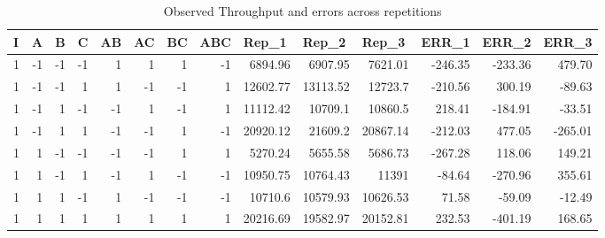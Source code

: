 \documentclass[11pt,a4paper]{article}
\begin{document}
\begin{table}[H]
	\caption{Observed Throughput and errors across repetitions}
	\begin{tabular}{|r|r|r|r|r|r|r|r|r|r|r|r|r|r|}
		\hline
		\multicolumn{1}{|l|}{I} & \multicolumn{1}{l|}{A} & \multicolumn{1}{l|}{B} & \multicolumn{1}{l|}{C} & \multicolumn{1}{l|}{AB} & \multicolumn{1}{l|}{AC} & \multicolumn{1}{l|}{BC} & \multicolumn{1}{l|}{ABC} & \multicolumn{1}{l|}{Rep\_1} & \multicolumn{1}{l|}{Rep\_2} & \multicolumn{1}{l|}{Rep\_3} & \multicolumn{1}{l|}{ERR\_1} & \multicolumn{1}{l|}{ERR\_2} & \multicolumn{1}{l|}{ERR\_3} \\ \hline
		1 & -1 & -1 & -1 & 1 & 1 & 1 & -1 & 6894.96 & 6907.95 & 7621.01 & -246.35 & -233.36 & 479.70 \\ \hline
		1 & -1 & -1 & 1 & 1 & -1 & -1 & 1 & 12602.77 & 13113.52 & 12723.7 & -210.56 & 300.19 & -89.63 \\ \hline
		1 & -1 & 1 & -1 & -1 & 1 & -1 & 1 & 11112.42 & 10709.1 & 10860.5 & 218.41 & -184.91 & -33.51 \\ \hline
		1 & -1 & 1 & 1 & -1 & -1 & 1 & -1 & 20920.12 & 21609.2 & 20867.14 & -212.03 & 477.05 & -265.01 \\ \hline
		1 & 1 & -1 & -1 & -1 & -1 & 1 & 1 & 5270.24 & 5655.58 & 5686.73 & -267.28 & 118.06 & 149.21 \\ \hline
		1 & 1 & -1 & 1 & -1 & 1 & -1 & -1 & 10950.75 & 10764.43 & 11391 & -84.64 & -270.96 & 355.61 \\ \hline
		1 & 1 & 1 & -1 & 1 & -1 & -1 & -1 & 10710.6 & 10579.93 & 10626.53 & 71.58 & -59.09 & -12.49 \\ \hline
		1 & 1 & 1 & 1 & 1 & 1 & 1 & 1 & 20216.69 & 19582.97 & 20152.81 & 232.53 & -401.19 & 168.65 \\ \hline
	\end{tabular}
	\label{}
\end{table}
\end{document}
